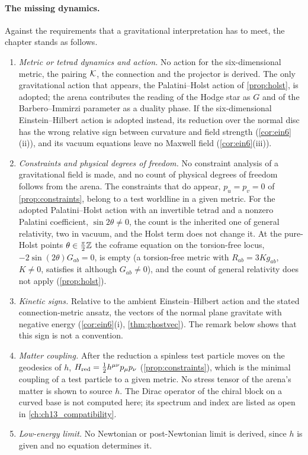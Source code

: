 \paragraph{The missing dynamics.} Against the requirements that a gravitational interpretation has to meet, the chapter stands as follows.
\begin{enumerate}[label=(\roman*),leftmargin=2.2em]
\item \emph{Metric or tetrad dynamics and action.} No action for the six-dimensional metric, the pairing $\mathcal K$, the connection and the projector
is derived. The only gravitational action that appears, the Palatini--Holst action of \cref{prop:holst}, is adopted; the arena contributes the
reading of the Hodge star as $G$ and of the Barbero--Immirzi parameter as a duality phase. If the six-dimensional Einstein--Hilbert action is
adopted instead, its reduction over the normal disc has the wrong relative sign between curvature and field strength (\cref{cor:ein6}(ii)),
and its vacuum equations leave no Maxwell field (\cref{cor:ein6}(iii)).
\item \emph{Constraints and physical degrees of freedom.} No constraint analysis of a gravitational field is made, and no count of
physical degrees of freedom follows from the arena. The constraints that do appear, $p_u=p_v=0$ of \cref{prop:constraints}, belong to a test
worldline in a given metric. For the adopted Palatini--Holst action with an invertible tetrad and a nonzero Palatini coefficient,
$\sin2\theta\neq0$, the count is the inherited one of general relativity, two in vacuum, and the Holst term does not change it. At the pure-Holst
points $\theta\in\tfrac\pi2\mathbb{Z}$ the coframe equation on the torsion-free locus, $-2\sin(2\theta)G_{ab}=0$, is empty (a torsion-free metric with
$R_{ab}=3Kg_{ab}$, $K\neq0$, satisfies it although $G_{ab}\neq0$), and the count of general relativity does not apply (\cref{prop:holst}).
\item \emph{Kinetic signs.} Relative to the ambient Einstein--Hilbert action and the stated connection-metric ansatz, the vectors of the normal
plane gravitate with negative energy (\cref{cor:ein6}(i), \cref{thm:ghostvec}). The
remark below shows that this sign is not a convention.
\item \emph{Matter coupling.} After the reduction a spinless test particle moves on the geodesics of $h$, $H_{\rm red}=\tfrac12h^{\mu\nu}p_\mu p_\nu$
(\cref{prop:constraints}), which is the minimal coupling of a test particle to a given metric. No stress tensor of the arena's matter is shown to
source $h$. The Dirac operator of the chiral block on a curved base is not computed here; its spectrum and index are listed as open in
\cref{ch:ch13_compatibility}.
\item \emph{Low-energy limit.} No Newtonian or post-Newtonian limit is derived, since $h$ is given and no equation determines it.
\end{enumerate}

